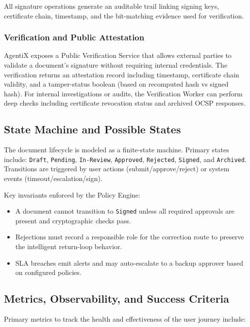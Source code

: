 \documentclass[12pt,oneside,openright,a4paper]{cpe-english-project}
\begin{document}
All signature operations generate an auditable trail linking signing
keys, certificate chain, timestamp, and the bit-matching evidence used
for verification.

\subsubsection{Verification and Public Attestation}

AgentiX exposes a Public Verification Service that allows external
parties to validate a document's signature without requiring internal
credentials. The verification returns an attestation record including
timestamp, certificate chain validity, and a tamper-status boolean
(based on recomputed hash vs signed hash). For internal investigations
or audits, the Verification Worker can perform deep checks including
certificate revocation status and archived OCSP responses.

\subsection{State Machine and Possible States}

The document lifecycle is modeled as a finite-state machine. Primary
states include: \texttt{Draft}, \texttt{Pending}, \texttt{In-Review},
\texttt{Approved}, \texttt{Rejected}, \texttt{Signed}, and
\texttt{Archived}. Transitions are triggered by user actions
(submit/approve/reject) or system events (timeout/escalation/sign).

Key invariants enforced by the Policy Engine:

\begin{itemize}
  \item A document cannot transition to \texttt{Signed} unless all
    required approvals are present and cryptographic checks pass.
  \item Rejections must record a responsible role for the correction
    route to preserve the intelligent return-loop behavior.
  \item SLA breaches emit alerts and may auto-escalate to a backup
    approver based on configured policies.
\end{itemize}

\subsection{Metrics, Observability, and Success Criteria}

Primary metrics to track the health and effectiveness of the user
journey include:
\end{document}

